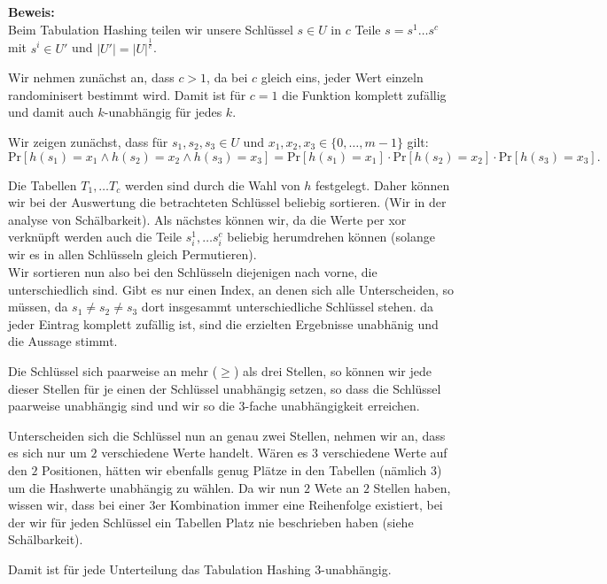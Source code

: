 \documentclass[11pt,a4paper,ngerman]{article}
\newcommand{\prob}[1]{\text{Pr}\left[ #1 \right]}
\begin{document}
\noindent\textbf{Beweis:}\\
Beim Tabulation Hashing teilen wir unsere Schlüssel $s \in U$ in $c$ Teile $s = s^1 \ldots s^c$ mit $s^i \in U'$ und $|U'| = |U|^\frac{1}{c}$.

Wir nehmen zunächst an, dass $c > 1$, da bei $c$ gleich eins, jeder Wert einzeln randominisert bestimmt wird. Damit ist für $c = 1$ die Funktion komplett zufällig und damit auch $k$-unabhängig für jedes $k$.

Wir zeigen zunächst, dass für $s_1,s_2,s_3 \in U$ und $x_1, x_2, x_3 \in \{ 0, \ldots , m-1\}$ gilt:
$$
	\prob{h(s_1) = x_1 \land h(s_2) = x_2 \land h(s_3) = x_3} = \prob{h(s_1)=x_1} \cdot \prob{h(s_2) = x_2} \cdot \prob{h(s_3) = x_3}.
$$

Die Tabellen $T_1, \ldots T_c$ werden sind durch die Wahl von $h$ festgelegt. Daher können wir bei der Auswertung die betrachteten Schlüssel beliebig sortieren. (Wir in der analyse von Schälbarkeit). Als nächstes können wir, da die Werte per xor verknüpft werden auch die Teile $s_i^1, \ldots s_i^c$ beliebig herumdrehen können (solange wir es in allen Schlüsseln gleich Permutieren).\\

Wir sortieren nun also bei den Schlüsseln diejenigen nach vorne, die unterschiedlich sind. Gibt es nur einen Index, an denen sich alle Unterscheiden,
so müssen, da $s_1 \not= s_2 \not= s_3$ dort insgesammt unterschiedliche Schlüssel stehen. da jeder Eintrag komplett zufällig ist, sind die erzielten Ergebnisse unabhänig und die Aussage stimmt.

Die Schlüssel sich paarweise an mehr ($\geq$) als drei Stellen, so können wir jede dieser Stellen für je einen der Schlüssel unabhängig setzen, so dass
die Schlüssel paarweise unabhängig sind und wir so die $3$-fache unabhängigkeit erreichen.

Unterscheiden sich die Schlüssel nun an genau zwei Stellen, nehmen wir an, dass es sich nur um $2$ verschiedene Werte handelt. Wären es $3$ verschiedene Werte auf den $2$ Positionen, hätten wir ebenfalls genug Plätze in den Tabellen (nämlich 3) um die Hashwerte unabhängig zu wählen.
Da wir nun $2$ Wete an $2$ Stellen haben, wissen wir, dass bei einer 3er Kombination immer eine Reihenfolge existiert, bei der wir für jeden Schlüssel ein Tabellen Platz nie beschrieben haben (siehe Schälbarkeit).

Damit ist für jede Unterteilung das Tabulation Hashing 3-unabhängig.\\
\end{document}
